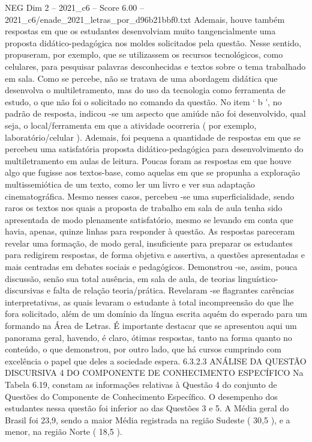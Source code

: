 \begin{textsample}{NEG Dim 2 – 2021\_c6 – Score 6.00 – 2021\_c6/enade\_2021\_letras\_por\_d96b21bbf0.txt}
Ademais, houve também respostas em que os estudantes desenvolviam muito tangencialmente uma proposta didático-pedagógica nos moldes solicitados pela questão.
Nesse sentido, propuseram, por exemplo, que se utilizassem os recursos tecnológicos, como celulares, para pesquisar palavras desconhecidas e textos sobre o tema trabalhado em sala.
Como se percebe, não se tratava de uma abordagem didática que desenvolva o multiletramento, mas do uso da tecnologia como ferramenta de estudo, o que não foi o solicitado no comando da questão.
No item ‘ b ’, no padrão de resposta, indicou -se um aspecto que amiúde não foi desenvolvido, qual seja, o local/ferramenta em que a atividade ocorreria ( por exemplo, laboratório/celular ).
Ademais, foi pequena a quantidade de respostas em que se percebeu uma satisfatória proposta didático-pedagógica para desenvolvimento do multiletramento em aulas de leitura.
Poucas foram as respostas em que houve algo que fugisse aos textos-base, como aquelas em que se propunha a exploração multissemiótica de um texto, como ler um livro e ver sua adaptação cinematográfica.
Mesmo nesses casos, percebeu -se uma superficialidade, sendo raros os textos nos quais a proposta de trabalho em sala de aula tenha sido apresentada de modo plenamente satisfatório, mesmo se levando em conta que havia, apenas, quinze linhas para responder à questão.
As respostas pareceram revelar uma formação, de modo geral, insuficiente para preparar os estudantes para redigirem respostas, de forma objetiva e assertiva, a questões apresentadas e mais centradas em debates sociais e pedagógicos.
Demonstrou -se, assim, pouca discussão, senão sua total ausência, em sala de aula, de teorias linguístico-discursivas e falta de relação teoria/prática.
Revelaram -se flagrantes carências interpretativas, as quais levaram o estudante à total incompreensão do que lhe fora solicitado, além de um domínio da língua escrita aquém do esperado para um formando na Área de Letras.
É importante destacar que se apresentou aqui um panorama geral, havendo, é claro, ótimas respostas, tanto na forma quanto no conteúdo, o que demonstrou, por outro lado, que há cursos cumprindo com excelência o papel que deles a sociedade espera. 6.3.2.3 ANÁLISE DA QUESTÃO DISCURSIVA 4 DO COMPONENTE DE CONHECIMENTO ESPECÍFICO Na Tabela 6.19, constam as informações relativas à Questão 4 do conjunto de Questões do Componente de Conhecimento Específico.
O desempenho dos estudantes nessa questão foi inferior ao das Questões 3 e 5.
A Média geral do Brasil foi 23,9, sendo a maior Média registrada na região Sudeste ( 30,5 ), e a menor, na região Norte ( 18,5 ).

\end{textsample}
